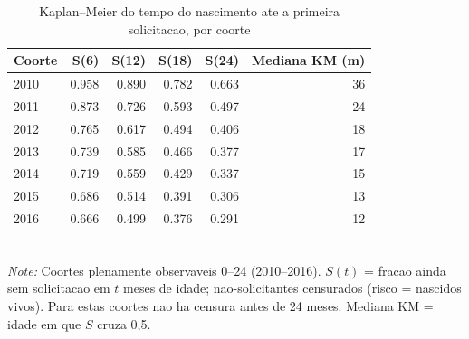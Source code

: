 \begin{table}[htbp]\centering
\caption{Kaplan--Meier do tempo do nascimento ate a primeira solicitacao, por coorte}
\label{tab:S2d_km}
\small
\begin{tabular}{lrrrrr}
\toprule
Coorte & S(6) & S(12) & S(18) & S(24) & Mediana KM (m) \\
\midrule
2010 & 0.958 & 0.890 & 0.782 & 0.663 & 36 \\
2011 & 0.873 & 0.726 & 0.593 & 0.497 & 24 \\
2012 & 0.765 & 0.617 & 0.494 & 0.406 & 18 \\
2013 & 0.739 & 0.585 & 0.466 & 0.377 & 17 \\
2014 & 0.719 & 0.559 & 0.429 & 0.337 & 15 \\
2015 & 0.686 & 0.514 & 0.391 & 0.306 & 13 \\
2016 & 0.666 & 0.499 & 0.376 & 0.291 & 12 \\
\bottomrule
\end{tabular}
\\[3pt]{\footnotesize \textit{Note:} Coortes plenamente observaveis 0--24 (2010--2016). $S(t)$ = fracao ainda sem solicitacao em $t$ meses de idade; nao-solicitantes censurados (risco = nascidos vivos). Para estas coortes nao ha censura antes de 24 meses. Mediana KM = idade em que $S$ cruza 0,5.}
\end{table}

